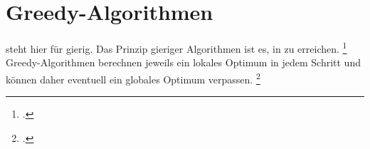 \documentclass{bschlangaul-theorie}
\begin{document}

\chapter{Greedy-Algorithmen}

\begin{liQuellen}
\item \cite[Seite 207-235 (PDF 225-253)]{saake}
\item \cite[Seite 5-6]{aud:fs:3}
\item \cite{wiki:greedy-algorithmus}
\end{liQuellen}

 steht hier für gierig. Das Prinzip gieriger Algorithmen
ist es, in  zu erreichen.
\footcite[Seite 213 (PDF 231)]{saake}
Greedy-Algorithmen berechnen jeweils ein lokales Optimum in jedem Schritt
und können daher eventuell ein globales Optimum verpassen.
\footcite[Seite 214 (PDF 232)]{saake}

\literatur
\end{document}
